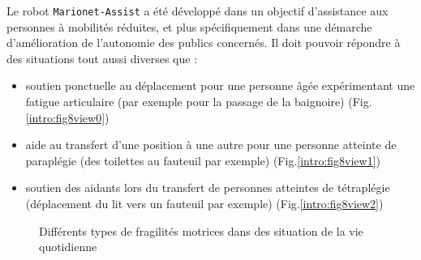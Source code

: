 Le robot {\tt Marionet-Assist} a été développé dans un objectif d'assistance aux personnes à mobilités réduites, et plus spécifiquement dans une démarche d'amélio\-ration de l'autonomie des publics concernés. Il doit pouvoir répondre à des situations tout aussi diverses que :
\begin{itemize}
 \item soutien ponctuelle au déplacement pour une personne âgée expérimentant une fatigue articulaire (par exemple pour la passage de la baignoire) (Fig.\ref{intro:fig8view0})
 \item aide au transfert d'une position à une autre pour une personne atteinte de paraplégie (des toilettes au fauteuil par exemple) (Fig.\ref{intro:fig8view1})
 \item soutien des aidants lors du transfert de personnes atteintes de tétraplégie (déplacement du lit vers un fauteuil par exemple) (Fig.\ref{intro:fig8view2})
\end{itemize}

\begin{figure}[htp]
  \centering
   \hfill
   \hfill
   \hfill
    \caption{\footnotesize{Différents types de fragilités motrices dans des situation de la vie quotidienne}}
\label{intro:fig8}
\end{figure}

